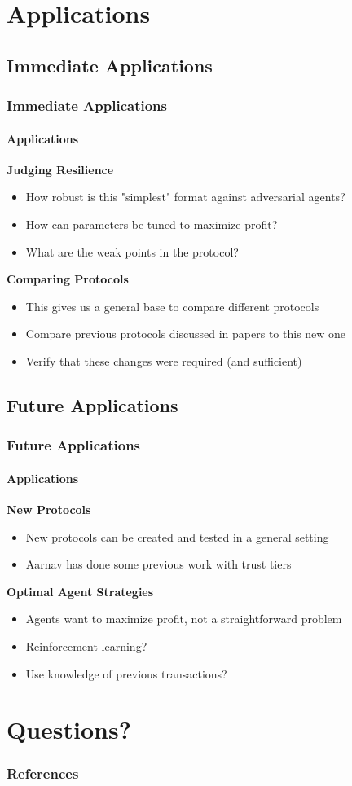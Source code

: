 \documentclass[
	10pt, %
	aspectratio=169, %
]{beamer}
\begin{document}
\section{Applications}
\frame{\sectionpage}
\subsection{Immediate Applications}
\begin{frame}
	\frametitle{Immediate Applications}
	\framesubtitle{Applications}

	{
		\large \bf
		Judging Resilience
	}
	\begin{itemize}
		\item How robust is this "simplest" format against adversarial agents?
		\item How can parameters be tuned to maximize profit?
		\item What are the weak points in the protocol?
	\end{itemize}

	\medskip

	{
		\large \bf
		Comparing Protocols
	}
	\begin{itemize}
		\item This gives us a general base to compare different protocols
		\item Compare previous protocols discussed in papers to this new one
		\item Verify that these changes were required (and sufficient)
	\end{itemize}
\end{frame}

\subsection{Future Applications}
\begin{frame}
	\frametitle{Future Applications}
	\framesubtitle{Applications}

	{
		\large \bf
		New Protocols
	}
	\begin{itemize}
		\item New protocols can be created and tested in a general setting
		\item Aarnav has done some previous work with trust tiers
	\end{itemize}

	\medskip

	{
		\large \bf
		Optimal Agent Strategies
	}
	\begin{itemize}
		\item Agents want to maximize profit, not a straightforward problem
		\item Reinforcement learning?
		\item Use knowledge of previous transactions?
	\end{itemize}
\end{frame}

\section{Questions?}
\frame{\sectionpage}

\begin{frame}[allowframebreaks]
	\frametitle{References}
	\printbibliography
\end{frame}
\end{document}
